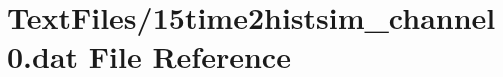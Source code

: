 \hypertarget{15time2histsim__channel0_8dat}{}\section{Text\+Files/15time2histsim\+\_\+channel0.dat File Reference}
\label{15time2histsim__channel0_8dat}
